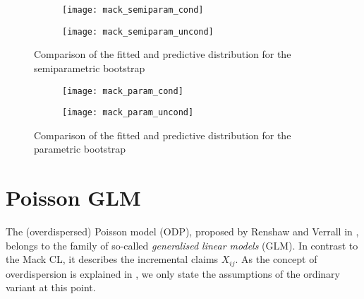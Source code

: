 \documentclass[a4paper]{book}
\begin{document}
\vspace{-0.75cm}

\begin{figure}[!htb]
  \begin{subfigure}{0.45 \textwidth}
    \texttt{[image: mack\_semiparam\_cond]}
  \end{subfigure}
  \begin{subfigure}{0.45 \textwidth}
    \texttt{[image: mack\_semiparam\_uncond]}
  \end{subfigure}
  \caption{Comparison of the fitted and predictive distribution for the semiparametric bootstrap}
  \label{fig:fit-pred-semiparam}
\end{figure}

\restoregeometry

\begin{landscape}
  \begin{figure}
    \begin{subfigure}{\linewidth}
      \texttt{[image: mack\_param\_cond]}
    \end{subfigure}
    \begin{subfigure}{\linewidth}
      \texttt{[image: mack\_param\_uncond]}
    \end{subfigure}
    \caption{Comparison of the fitted and predictive distribution for the parametric bootstrap}
    \label{fig:fit-pred-param}
  \end{figure}
\end{landscape}

\chapter{Poisson GLM} \label{chapter:poisson}

The (overdispersed) Poisson model (ODP), proposed by Renshaw and Verrall in \cite{renshaw}, belongs to the family of so-called \emph{generalised linear models} (GLM). In contrast to the Mack CL, it describes the incremental claims $X_{ij}$. As the concept of overdispersion is explained in , we only state the assumptions of the ordinary variant at this point.
\end{document}
